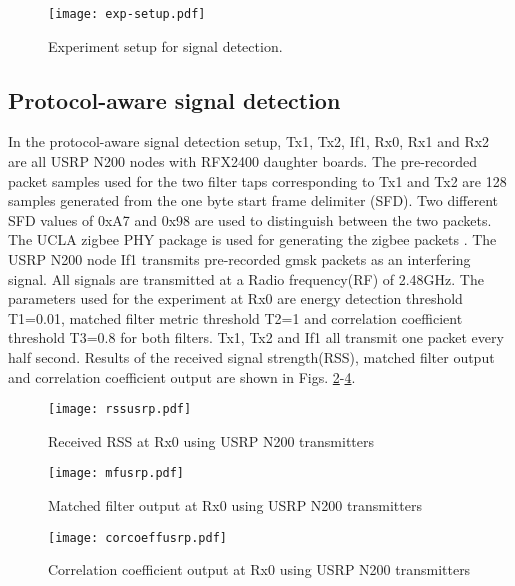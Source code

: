 \documentclass[journal]{IEEEtran}
\begin{document}
\begin{figure}[htb]
\begin{center}
	\texttt{[image: exp-setup.pdf]} 
\caption{Experiment setup for signal detection.}
\label{fig:exp-setup}
\end{center}
\end{figure}

\subsection{Protocol-aware signal detection} \label{sec:protaware}
In the protocol-aware signal detection setup, Tx1, Tx2, If1, Rx0, Rx1 and Rx2 are all USRP N200 nodes with RFX2400 daughter boards. The pre-recorded packet samples used for the two filter taps corresponding to Tx1 and Tx2 are 128 samples generated from the one byte start frame delimiter (SFD). Two different SFD values of 0xA7 and 0x98 are used to distinguish between the two packets. The UCLA zigbee PHY package is used for generating the zigbee packets \cite{schmid2006gnu} \cite{choong2009multi}. The USRP N200 node If1 transmits pre-recorded gmsk packets as an interfering signal. All signals are transmitted at a Radio frequency(RF)  of 2.48GHz. The parameters used for the experiment at Rx0 are energy detection threshold T1=0.01, matched filter metric threshold T2=1 and correlation coefficient threshold T3=0.8 for both filters. Tx1, Tx2 and If1 all transmit one packet every half second. Results of the received signal strength(RSS), matched filter output and correlation coefficient output are shown in  Figs. \ref{fig:rssusrp}-\ref{fig:corcoeffusrp}.

\begin{figure}[htb]
\begin{center}
	\texttt{[image: rssusrp.pdf]} 
\caption{Received RSS at Rx0 using USRP N200 transmitters}
\label{fig:rssusrp}
\end{center}
\end{figure}

\begin{figure}[htb]
\begin{center}
	\texttt{[image: mfusrp.pdf]} 
\caption{Matched filter output at Rx0 using USRP N200 transmitters}
\label{fig:mfusrp}
\end{center}
\end{figure}

\begin{figure}[htb]
\begin{center}
	\texttt{[image: corcoeffusrp.pdf]} 
\caption{Correlation coefficient output at Rx0 using USRP N200 transmitters}
\label{fig:corcoeffusrp}
\end{center}
\end{figure}
\end{document}
